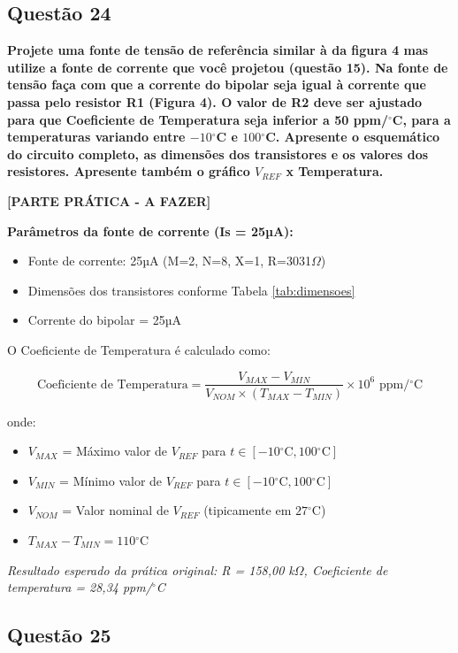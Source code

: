 \documentclass[12pt,a4paper]{article}
\newcommand{\degree}{\ensuremath{{}^\circ}}
\begin{document}
\subsection*{Questão 24}

\textbf{Projete uma fonte de tensão de referência similar à da figura 4 mas utilize a fonte de corrente que você projetou (questão 15). Na fonte de tensão faça com que a corrente do bipolar seja igual à corrente que passa pelo resistor R1 (Figura 4). O valor de R2 deve ser ajustado para que Coeficiente de Temperatura seja inferior a 50 ppm/$\degree$C, para a temperaturas variando entre $-10\degree$C e $100\degree$C. Apresente o esquemático do circuito completo, as dimensões dos transistores e os valores dos resistores. Apresente também o gráfico $V_{REF}$ x Temperatura.}

\textbf{[PARTE PRÁTICA - A FAZER]}

\textbf{Parâmetros da fonte de corrente (Is = 25µA):}
\begin{itemize}
    \item Fonte de corrente: 25µA (M=2, N=8, X=1, R=3031$\Omega$)
    \item Dimensões dos transistores conforme Tabela \ref{tab:dimensoes}
    \item Corrente do bipolar = 25µA
\end{itemize}

O Coeficiente de Temperatura é calculado como:

$$\text{Coeficiente de Temperatura} = \frac{V_{MAX} - V_{MIN}}{V_{NOM} \times (T_{MAX} - T_{MIN})} \times 10^6 \text{ ppm}/\degree\text{C}$$

onde:
\begin{itemize}
    \item $V_{MAX}$ = Máximo valor de $V_{REF}$ para $t \in [-10\degree\text{C}, 100\degree\text{C}]$
    \item $V_{MIN}$ = Mínimo valor de $V_{REF}$ para $t \in [-10\degree\text{C}, 100\degree\text{C}]$
    \item $V_{NOM}$ = Valor nominal de $V_{REF}$ (tipicamente em $27\degree\text{C}$)
    \item $T_{MAX} - T_{MIN} = 110\degree\text{C}$
\end{itemize}

\textit{Resultado esperado da prática original: R = 158,00 k$\Omega$, Coeficiente de temperatura = 28,34 ppm/$\degree$C}

\subsection*{Questão 25}
\end{document}

